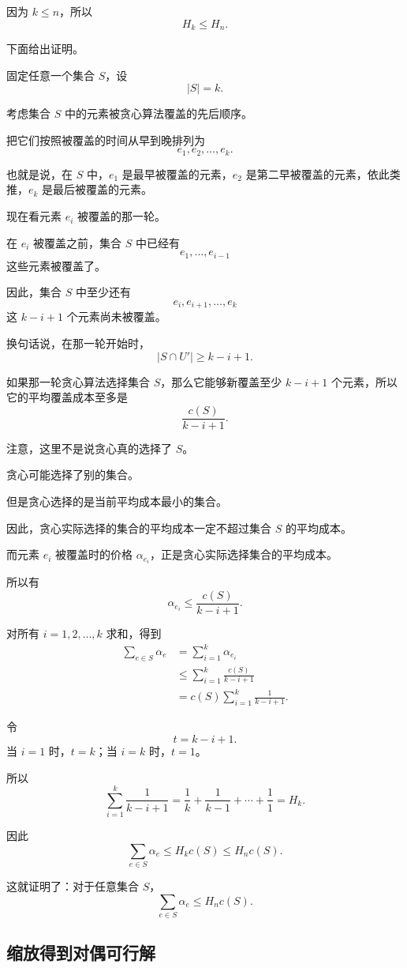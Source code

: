 \documentclass[UTF8,openany,12pt]{ctexbook}
\theoremstyle{remark}
\begin{document}
因为 $k\le n$，所以
\[
  H_k\le H_n.
\]

下面给出证明。

固定任意一个集合 $S$，设
\[
  |S|=k.
\]

考虑集合 $S$ 中的元素被贪心算法覆盖的先后顺序。

把它们按照被覆盖的时间从早到晚排列为
\[
  e_1,e_2,\dots,e_k.
\]

也就是说，在 $S$ 中，$e_1$ 是最早被覆盖的元素，$e_2$ 是第二早被覆盖的元素，依此类推，$e_k$ 是最后被覆盖的元素。

现在看元素 $e_i$ 被覆盖的那一轮。

在 $e_i$ 被覆盖之前，集合 $S$ 中已经有
\[
  e_1,\dots,e_{i-1}
\]
这些元素被覆盖了。

因此，集合 $S$ 中至少还有
\[
  e_i,e_{i+1},\dots,e_k
\]
这 $k-i+1$ 个元素尚未被覆盖。

换句话说，在那一轮开始时，
\[
  |S\cap U'| \ge k-i+1.
\]

如果那一轮贪心算法选择集合 $S$，那么它能够新覆盖至少 $k-i+1$ 个元素，所以它的平均覆盖成本至多是
\[
  \frac{c(S)}{k-i+1}.
\]

注意，这里不是说贪心真的选择了 $S$。

贪心可能选择了别的集合。

但是贪心选择的是当前平均成本最小的集合。

因此，贪心实际选择的集合的平均成本一定不超过集合 $S$ 的平均成本。

而元素 $e_i$ 被覆盖时的价格 $\alpha_{e_i}$，正是贪心实际选择集合的平均成本。

所以有
\[
  \alpha_{e_i}
  \le
  \frac{c(S)}{k-i+1}.
\]

对所有 $i=1,2,\dots,k$ 求和，得到
\[
\begin{aligned}
  \sum_{e\in S}\alpha_e
  &=
  \sum_{i=1}^k \alpha_{e_i} \\
  &\le
  \sum_{i=1}^k \frac{c(S)}{k-i+1} \\
  &=
  c(S)\sum_{i=1}^k \frac1{k-i+1}.
\end{aligned}
\]

令
\[
  t=k-i+1.
\]
当 $i=1$ 时，$t=k$；当 $i=k$ 时，$t=1$。

所以
\[
  \sum_{i=1}^k \frac1{k-i+1}
  =
  \frac1k+\frac1{k-1}+\cdots+\frac11
  =
  H_k.
\]

因此
\[
  \sum_{e\in S}\alpha_e
  \le
  H_k c(S)
  \le
  H_n c(S).
\]

这就证明了：对于任意集合 $S$，
\[
  \sum_{e\in S}\alpha_e \le H_n c(S).
\]

\subsection{缩放得到对偶可行解}
\end{document}
